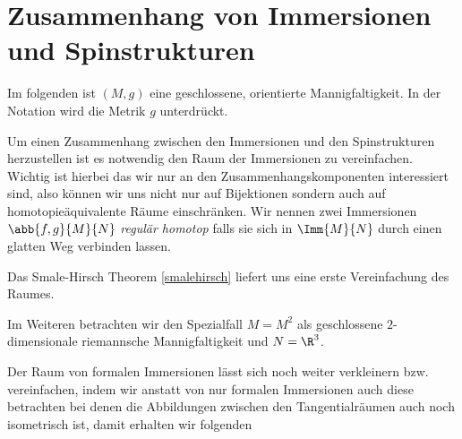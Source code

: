 


\section{Zusammenhang von Immersionen und Spinstrukturen}

Im folgenden ist $(M,g)$ eine geschlossene, orientierte Mannigfaltigkeit.
In der Notation wird die Metrik $g$ unterdrückt.


Um einen Zusammenhang zwischen den Immersionen und den Spinstrukturen
herzustellen ist es notwendig den Raum der Immersionen zu
vereinfachen.  Wichtig ist hierbei das wir nur an den
Zusammenhangskomponenten interessiert sind, also können wir uns nicht
nur auf Bijektionen sondern auch auf homotopieäquivalente Räume
einschränken.  Wir nennen zwei Immersionen $ \abb{f,g}{M}{N} $
\textit{regulär homotop} falls sie sich in $ \Imm{M}{N} $ durch einen
glatten Weg verbinden lassen.

 Das Smale-Hirsch Theorem \cref{smalehirsch} liefert uns eine erste Vereinfachung des Raumes. 

Im Weiteren betrachten wir den Spezialfall $ M=M^2 $ als geschlossene $ 2 $-dimensionale riemannsche Mannigfaltigkeit und
$ N=\R^3 $.

Der Raum von formalen Immersionen lässt sich noch weiter verkleinern
bzw. vereinfachen, indem wir anstatt von nur formalen Immersionen auch
diese betrachten bei denen die Abbildungen zwischen den
Tangentialräumen auch noch isometrisch ist, damit erhalten wir
folgenden


